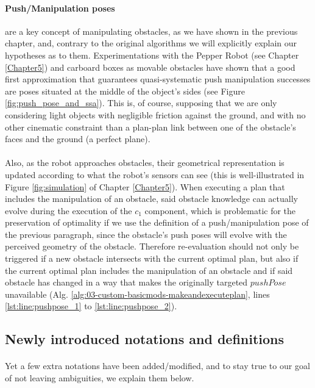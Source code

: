 \paragraph{Push/Manipulation poses} are a key concept of manipulating obstacles, as we have shown in the previous chapter, and, contrary to the original algorithms we will explicitly explain our hypotheses as to them. Experimentations with the Pepper Robot (see Chapter \ref{Chapter5}) and carboard boxes as movable obstacles have shown that a good first approximation that guarantees quasi-systematic push manipulation successes are poses situated at the middle of the object's sides (see Figure \ref{fig:push_pose_and_ssa}). This is, of course, supposing that we are only considering light objects with negligible friction against the ground, and with no other cinematic constraint than a plan-plan link between one of the obstacle's faces and the ground (a perfect plane).

\paragraph{} Also, as the robot approaches obstacles, their geometrical representation is updated according to what the robot's sensors can see (this is well-illustrated in Figure \ref{fig:simulation} of Chapter \ref{Chapter5}). When executing a plan that includes the manipulation of an obstacle, said obstacle knowledge can actually evolve during the execution of the $c_{1}$ component, which is problematic for the preservation of optimality if we use the definition of a push/manipulation pose of the previous paragraph, since the obstacle's push poses will evolve with the perceived geometry of the obstacle. Therefore re-evaluation should not only be triggered if a new obstacle intersects with the current optimal plan, but also if the current optimal plan includes the manipulation of an obstacle and if said obstacle has changed in a way that makes the originally targeted $pushPose$ unavailable (Alg. \ref{alg:03-custom-basicmods-makeandexecuteplan}, lines \ref{lst:line:pushpose_1} to \ref{lst:line:pushpose_2}).

\subsection*{Newly introduced notations and definitions}

\paragraph{} Yet a few extra notations have been added/modified, and to stay true to our goal of not leaving ambiguities, we explain them below.


